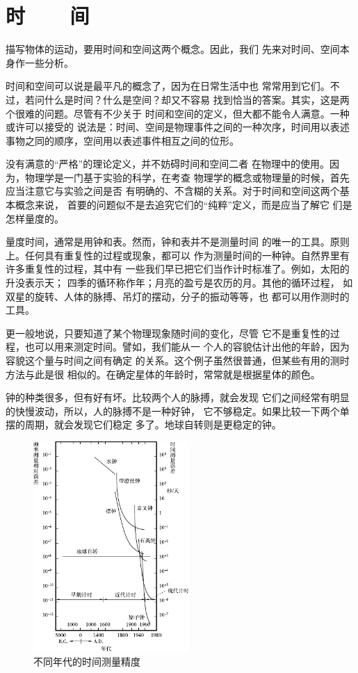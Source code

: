 \section[时间]{时~~~~间}\label{sec:01.01}

描写物体的运动，要用时间和空间这两个概念。因此，我们
先来对时间、空间本身作一些分析。

时间和空间可以说是最平凡的概念了，因为在日常生活中也
常常用到它们。不过，若问什么是时间？什么是空间？却又不容易
找到恰当的答案。其实，这是两个很难的问题。尽管有不少关于
时间和空间的定义，但大都不能令人满意。一种或许可以接受的
说法是：时间、空间是物理事件之间的一种次序，时间用以表述
事物之同的顺序，空间用以表述事件相互之间的位形。

没有满意的“严格”的理论定义，并不妨碍时间和空间二者
在物理中的使用。因为，物理学是一门基于实验的科学，在考查
物理学的概念或物理量的时候，首先应当注意它与实验之间是否
有明确的、不含糊的关系。对于时间和空间这两个基本概念来说，
首要的问题似不是去追究它们的“纯粹”定义，而是应当了解它
们是怎样量度的。

量度时间，通常是用钟和表。然而，钟和表并不是测量时间
的唯一的工具。原则上。任何具有重复性的过程或现象，都可以
作为测量时间的一种钟。自然界里有许多重复性的过程，其中有
一些我们早已把它们当作计时标准了。例如，太阳的升没表示天；
四季的循环称作年；月亮的盈亏是农历的月。其他的循环过程，
如双星的旋转、人体的脉搏、吊灯的摆动，分子的振动等等，也
都可以用作测时的工具。

更一般地说，只要知道了某个物理现象随时间的变化，尽管
它不是重复性的过程，也可以用来测定时间。譬如，我们能从一
个人的容貌估计出他的年龄，因为容貌这个量与时间之间有确定
的关系。这个例子虽然很普通，但某些有用的测时方法与此是很
相似的。在确定星体的年龄时，常常就是根据星体的颜色。

钟的种类很多，但有好有坏。比较两个人的脉搏，就会发现
它们之间经常有明显的快慢波动，所以，人的脉搏不是一种好钟，
它不够稳定。如果比较一下两个单摆的周期，就会发现它们稳定
多了。地球自转则是更稳定的钟。
\begin{figure}[!h]
    \centering
    \includegraphics[height=8cm]{figure/fig01.01}
    \caption{不同年代的时间测量精度}
    \label{fig:01.01}
\end{figure}

